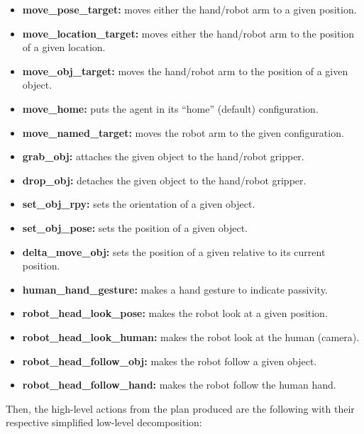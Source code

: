 \begin{itemize}
    \itemsep0em
    \item \textbf{move\_pose\_target:}          moves either the hand/robot arm to a given position.
    \item \textbf{move\_location\_target:}      moves either the hand/robot arm to the position of a given location.
    \item \textbf{move\_obj\_target:}           moves the hand/robot arm to the position of a given object.
    \item \textbf{move\_home:}                  puts the agent in its ``home'' (default) configuration. 
    \item \textbf{move\_named\_target:}         moves the robot arm to the given configuration.
    \item \textbf{grab\_obj:}                   attaches the given object to the hand/robot gripper. 
    \item \textbf{drop\_obj:}                   detaches the given object to the hand/robot gripper.
    \item \textbf{set\_obj\_rpy:}               sets the orientation of a given object.
    \item \textbf{set\_obj\_pose:}              sets the position of a given object.
    \item \textbf{delta\_move\_obj:}            sets the position of a given relative to its current position.
    \item \textbf{human\_hand\_gesture:}        makes a hand gesture to indicate passivity.
    \item \textbf{robot\_head\_look\_pose:}     makes the robot look at a given position.
    \item \textbf{robot\_head\_look\_human:}    makes the robot look at the human (camera).
    \item \textbf{robot\_head\_follow\_obj:}    makes the robot follow a given object.
    \item \textbf{robot\_head\_follow\_hand:}   makes the robot follow the human hand.
\end{itemize}

Then, the high-level actions from the plan produced are the following with their respective simplified low-level decomposition:

